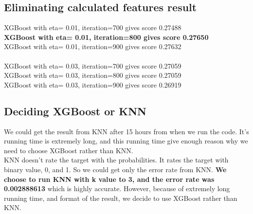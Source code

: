 \documentclass[fleqn,10pt]{SelfArx} %
\begin{document}
\subsection{Eliminating calculated features result}
XGBoost with eta= 0.01, iteration=700 gives score 0.27488\\
\textbf{XGBoost with eta= 0.01, iteration=800 gives score 0.27650}\\
XGBoost with eta= 0.01, iteration=900 gives score 0.27632\\
\\
XGBoost with eta= 0.03, iteration=700 gives score 0.27059\\
XGBoost with eta= 0.03, iteration=800 gives score 0.27059\\
XGBoost with eta= 0.03, iteration=900 gives score 0.26919\\

\subsection{Deciding XGBoost or KNN}
\hspace{\parindent} We could get the result from KNN after 15 hours from when we run the code. It’s running time is extremely long, and this running time give enough reason why we need to choose XGBoost rather than KNN. \\
KNN doesn’t rate the target with the probabilities. It rates the target with binary value, 0, and 1. So we could get only the error rate from KNN. \textbf{We choose to run KNN with k value to 3, and the error rate was 0.002888613} which is highly accurate. However, because of extremely long running time, and format of the result, we decide to use XGBoost rather than KNN.



\bigskip
\bigskip
\end{document}
